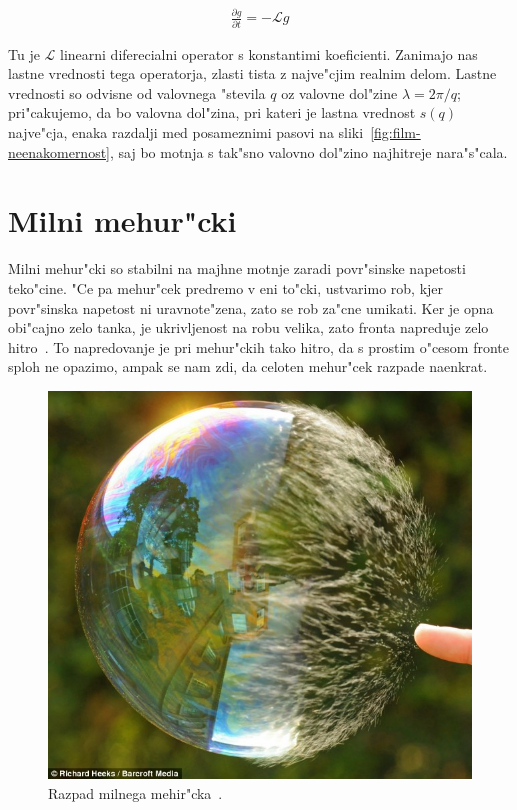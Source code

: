 \documentclass[a4paper,10pt]{article}
\newcommand{\odv}[1]{\frac{\partial #1}{\partial t}}
\begin{document}
\begin{align}
 \odv{g} = -\mathcal{L}g
\end{align}

Tu je $\mathcal{L}$ linearni diferecialni operator s konstantimi koeficienti. Zanimajo nas lastne vrednosti tega operatorja, zlasti tista z najve"cjim realnim delom. Lastne vrednosti so odvisne od valovnega "stevila $q$ oz valovne dol"zine $\lambda = 2\pi/q$; pri"cakujemo, da bo valovna dol"zina, pri kateri je lastna vrednost $s(q)$ najve"cja, enaka razdalji med posameznimi pasovi na sliki~\ref{fig:film-neenakomernost}, saj bo motnja s tak"sno valovno dol"zino najhitreje nara"s"cala. 

\section{Milni mehur"cki}

Milni mehur"cki so stabilni na majhne motnje zaradi povr"sinske napetosti teko"cine. "Ce pa mehur"cek predremo v eni to"cki, ustvarimo rob, kjer povr"sinska napetost ni uravnote"zena, zato se rob za"cne umikati. Ker je opna obi"cajno zelo tanka, 
je ukrivljenost na robu velika, zato fronta napreduje zelo hitro~\cite{diploma}. To napredovanje je pri mehur"ckih tako hitro, da s prostim o"cesom fronte sploh ne opazimo, ampak se nam zdi, da celoten mehur"cek razpade naenkrat. 
 
\begin{figure}[h]
 \centering
\includegraphics[width=.8\textwidth]{./Slike/bubble-3}
\caption{Razpad milnega mehir"cka~\cite{slike-mehurcek}. }
\label{fig:mehurcek-3}
\end{figure}
\end{document}
